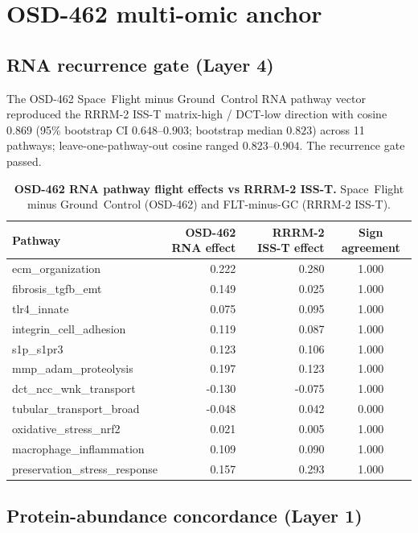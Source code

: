 \documentclass[10pt]{article}
\begin{document}
\section{OSD-462 multi-omic anchor}

\subsection{RNA recurrence gate (Layer 4)}

The OSD-462 Space~Flight minus Ground~Control RNA pathway vector reproduced the RRRM-2 ISS-T matrix-high / DCT-low direction with cosine $0.869$ (95\% bootstrap CI $0.648$--$0.903$; bootstrap median $0.823$) across 11 pathways; leave-one-pathway-out cosine ranged $0.823$--$0.904$. The recurrence gate passed.

\begin{table}[H]
\centering\small
\caption{\textbf{OSD-462 RNA pathway flight effects vs RRRM-2 ISS-T.} Space~Flight minus Ground~Control (OSD-462) and FLT-minus-GC (RRRM-2 ISS-T).}
\label{tab:rnapath}
\begin{tabular}{lrrc}
\toprule
Pathway & OSD-462 RNA effect & RRRM-2 ISS-T effect & Sign agreement \\
\midrule
ecm\_organization & 0.222 & 0.280 & 1.000 \\
fibrosis\_tgfb\_emt & 0.149 & 0.025 & 1.000 \\
tlr4\_innate & 0.075 & 0.095 & 1.000 \\
integrin\_cell\_adhesion & 0.119 & 0.087 & 1.000 \\
s1p\_s1pr3 & 0.123 & 0.106 & 1.000 \\
mmp\_adam\_proteolysis & 0.197 & 0.123 & 1.000 \\
dct\_ncc\_wnk\_transport & -0.130 & -0.075 & 1.000 \\
tubular\_transport\_broad & -0.048 & 0.042 & 0.000 \\
oxidative\_stress\_nrf2 & 0.021 & 0.005 & 1.000 \\
macrophage\_inflammation & 0.109 & 0.090 & 1.000 \\
preservation\_stress\_response & 0.157 & 0.293 & 1.000 \\

\bottomrule
\end{tabular}
\end{table}

\subsection{Protein-abundance concordance (Layer 1)}
\end{document}
